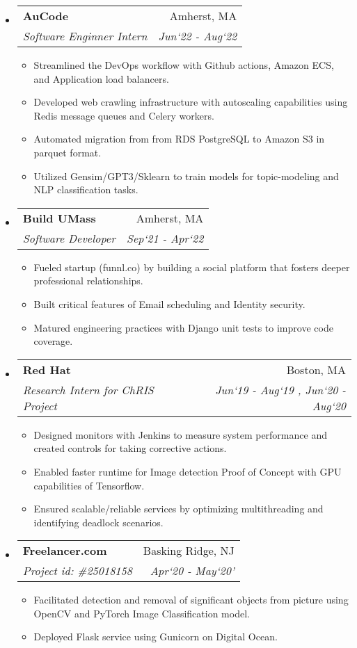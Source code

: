 \documentclass[letterpaper,8pt]{article}
\makeatletter
\newcommand{\resitem}[1]{\item #1 \vspace{-1pt}}
\newcommand{\resheading}[1]{{\normalsize \parashade[.9]{sharpcorners}{\textbf{#1 \vphantom{p\^{E}}}}}}
\newcommand{\ressubheading}[4]{
\begin{tabular*}{6.5in}{l@{\extracolsep{\fill}}r}
		\textbf{#1} & #2 \\
		\textit{#3} & \textit{#4} \\
\end{tabular*}\vspace{-4pt}}
\makeatother
\begin{document}
\resheading{Work Experience}
\begin{itemize}
\item
	\ressubheading{AuCode}{Amherst, MA}{Software Enginner Intern}{Jun`22 - Aug`22}
	\begin{itemize}
		\resitem{Streamlined the DevOps workflow with Github actions, Amazon ECS, and Application load balancers.}
		\resitem{Developed web crawling infrastructure with autoscaling capabilities using Redis message queues and Celery workers.}
		\resitem{Automated migration from from RDS PostgreSQL to Amazon S3 in parquet format.}
		\resitem{Utilized Gensim/GPT3/Sklearn to train models for topic-modeling and NLP classification tasks.}
	\end{itemize}

\item
	\ressubheading{Build UMass}{Amherst, MA}{Software Developer}{Sep`21 - Apr`22}
	\begin{itemize}
		\resitem{Fueled startup (funnl.co) by building a social platform that fosters deeper professional relationships.}
		\resitem{Built critical features of Email scheduling and Identity security.}
		\resitem{Matured engineering practices with Django unit tests to improve code coverage.}
	\end{itemize}

\item 
	\ressubheading{Red Hat}{Boston, MA}{Research Intern for ChRIS Project}{Jun`19 - Aug`19 , Jun`20 - Aug`20}
	\begin{itemize}
		\resitem{Designed monitors with Jenkins to measure system performance and created controls for taking corrective actions.}
		\resitem{Enabled faster runtime for Image detection Proof of Concept with GPU capabilities of Tensorflow.}
		\resitem{Ensured scalable/reliable services by optimizing multithreading and identifying deadlock scenarios.}
	\end{itemize}

\item
	\ressubheading{Freelancer.com}{Basking Ridge, NJ}{Project id: \#25018158}{Apr`20 - May`20'}
	\begin{itemize}
		\resitem{Facilitated detection and removal of significant objects from picture using OpenCV and PyTorch Image Classification model.}
		\resitem{Deployed Flask service using Gunicorn on Digital Ocean.}
	\end{itemize}

\end{itemize}
\end{document}
